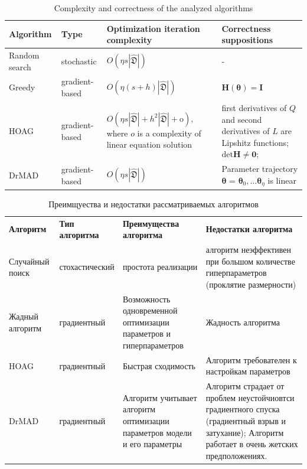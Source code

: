 \begin{table}
\small

\begin{tabularx}{\textwidth}{|X|X|X|X|}
\hline
\bf Algorithm & \bf Type & \bf Optimization iteration complexity & \bf Correctness suppositions  \\ 
\hline
Random search & stochastic & $O(\eta s |\hat{\mathfrak{D}}|)$& -  \\ \hline
Greedy~\cite{greed_hyper} & gradient-based & $O(\eta (s+h) |\hat{\mathfrak{D}}|)$ & $\mathbf{H}(\boldsymbol{\theta}) = \mathbf{I}$  \\ \hline
HOAG~\cite{hyper_hoag} & gradient-based & $O(\eta s |\hat{\mathfrak{D}}| + h^2 |\hat{\mathfrak{D}}| + \text{o}),$ where $o$ is a complexity of linear equation solution& first derivatives of $Q$  and second derivatives of $L$ are Lipshitz functions;  $\text{det}\mathbf{H} \neq \mathbf{0}$;  \\ \hline
DrMAD~\cite{hyper_mad} & gradient-based &$O(\eta s |\hat{\mathfrak{D}}|)$ & Parameter trajectory$\boldsymbol{\theta}$ = $\boldsymbol{\theta}_0, \dots \boldsymbol{\theta}_\eta$  is linear \\ \hline
\end{tabularx}

\caption{Complexity and correctness of the analyzed algorithms}
\label{table:algo_descr}

\end{table}


\begin{table}
\small

\begin{tabularx}{\textwidth}{|X|X|X|X|}
\hline
\bf Алгоритм & \bf Тип алгоритма & \bf Преимущества алгоритма & \bf Недостатки алгоритма  \\ 
Случайный поиск & стохастический & простота реализации& алгоритм неэффективен при большом количестве гиперпараметров (проклятие размерности)  \\ \hline
Жадный алгоритм~\cite{greed_hyper} & градиентный & Возможность одновременной оптимизации параметров и гиперпараметров & Жадность алгоритма \\ \hline
HOAG~\cite{hyper_hoag} & градиентный & Быстрая сходимость & Алгоритм требователен к настройкам параметров \\ \hline 
DrMAD~\cite{hyper_mad} & градиентный & Алгоритм учитывает алгоритм оптимизации параметров модели и его параметры & Алгоритм страдает от проблем неустойчиовтси градиентного спуска (градиентный взрыв и затухание); Алгоритм работает в очень жетских предположениях. \\ \hline
\end{tabularx}

\caption{Преимщуества и недостатки рассматриваемых алгоритмов}
\label{table:algo_descr}

\end{table}



